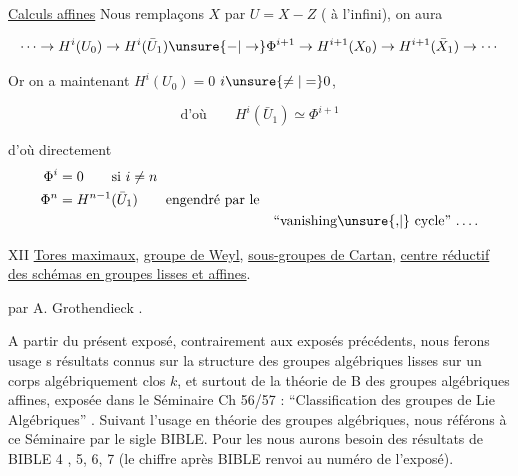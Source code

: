



\uline{Calculs affines} \qquad Nous remplaçons $X$ par $U=X-Z$ ( à l'infini), on aura

\[
\cdots\to H^i(U_0)\to H^i(\bar U_1)\unsure{\mathord{-}|\to}\Phi^{i+1}\to H^{i+1}(X_0)\to H^{i+1}(\bar X_1)\to\cdots
\]

Or on a maintenant \uline{$H^i(U_0)=0$} \qquad $i\unsure{\ne|=}0$,

\[
\text{d'où}\qquad H^i(\bar U_1)\simeq\Phi^{i+1}
\]

d'où directement
\[
\begin{aligned}
\Phi^i&=0\qquad\text{si }i\ne n\\
\Phi^n&=H^{n-1}(\bar U_1)\qquad\text{engendré par le}\\
&&\text{``vanishing\unsure{,|\null} cycle'' \ldots.}
\end{aligned}
\]


XII \quad \uline{Tores maximaux}, \uline{groupe de Weyl}, \uline{sous-groupes de Cartan}, \uline{centre réductif des schémas en groupes lisses et affines}.

par A. Grothendieck .

A partir du présent exposé, contrairement aux exposés précédents, nous ferons usage s résultats connus sur la structure des groupes algébriques lisses sur un corps algébriquement clos $k$, et surtout de la théorie de B des groupes algébriques affines, exposée dans le Séminaire Ch 56/57 :  ``Classification des groupes de Lie Algébriques'' . Suivant l'usage en théorie des groupes algébriques, nous référons à ce Séminaire par le sigle BIBLE. Pour les   nous aurons besoin  des résultats de BIBLE 4 , 5, 6, 7 (le chiffre après BIBLE renvoi au numéro de l'exposé).

